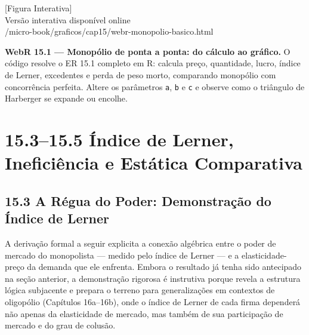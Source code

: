 \documentclass[11pt,twoside,openright]{book}
\newcommand{\figurePlaceholder}[1]{%
  \begin{center}
    \begin{tcolorbox}[
      width=0.85\textwidth,
      colback=graybg,
      colframe=gray,
      boxrule=0.5pt,
      arc=2pt,
      halign=center,
      valign=center,
      height=5cm
    ]
      \centering
      \vfill
      {\sffamily\color{gray}\large [Figura Interativa]}\\[6pt]
      {\sffamily\small\color{gray} Versão interativa disponível online}\\[4pt]
      {\ttfamily\tiny\color{gray} #1}
      \vfill
    \end{tcolorbox}
  \end{center}
}
\begin{document}
\figurePlaceholder{/micro-book/graficos/cap15/webr-monopolio-basico.html}

\textbf{WebR 15.1 --- Monopólio de ponta a ponta: do cálculo ao
gráfico.} O código resolve o ER 15.1 completo em R: calcula preço,
quantidade, lucro, índice de Lerner, excedentes e perda de peso morto,
comparando monopólio com concorrência perfeita. Altere os parâmetros
\texttt{a}, \texttt{b} e \texttt{c} e observe como o triângulo de
Harberger se expande ou encolhe.

\chapter{15.3--15.5 Índice de Lerner, Ineficiência e Estática
Comparativa}\label{uxedndice-de-lerner-ineficiuxeancia-e-estuxe1tica-comparativa}

\section{15.3 A Régua do Poder: Demonstração do Índice de
Lerner}\label{153}

A derivação formal a seguir explicita a conexão algébrica entre o poder
de mercado do monopolista --- medido pelo índice de Lerner --- e a
elasticidade-preço da demanda que ele enfrenta. Embora o resultado já
tenha sido antecipado na seção anterior, a demonstração rigorosa é
instrutiva porque revela a estrutura lógica subjacente e prepara o
terreno para generalizações em contextos de oligopólio (Capítulos
16a--16b), onde o índice de Lerner de cada firma dependerá não apenas da
elasticidade de mercado, mas também de sua participação de mercado e do
grau de colusão.
\end{document}
